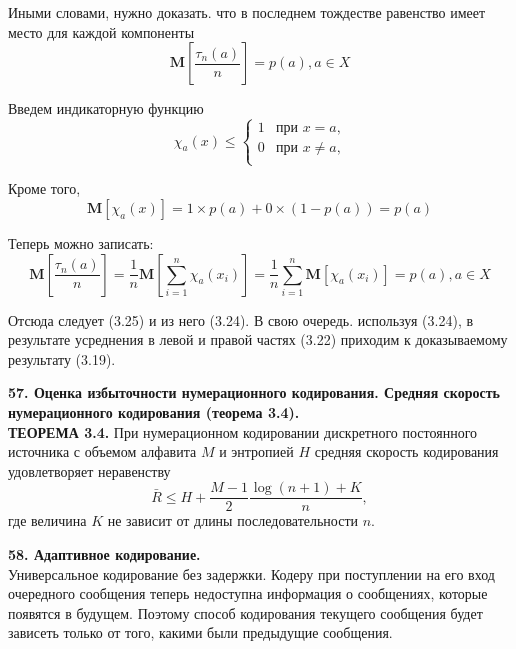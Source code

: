 \documentclass[14pt]{article}
\begin{document}
Иными словами, нужно доказать. что в последнем тождестве равенство имеет место для каждой компоненты
\begin{displaymath}
    \textbf{M}\left[\frac{\tau_n(a)}{n}\right] = p(a), a \in X
\end{displaymath}

Введем индикаторную функцию
\begin{displaymath}
    \chi_a(x) \leq \left\{ \begin{array}{ll}
    1 & \textrm{при \(x = a\),}\\
    0 & \textrm{при \(x \neq a\),}\\
  \end{array} \right.
\end{displaymath}

Кроме того,
\begin{displaymath}
    \textbf{M}[\chi_a(x)] = 1 \times p(a) + 0 \times (1 - p(a)) = p(a) 
\end{displaymath}

Теперь можно записать:
\begin{displaymath}
    \textbf{M}\left[\frac{\tau_n(a)}{n}\right] = \frac{1}{n}\textbf{M}\left[\sum_{i=1}^{n} \chi_a(x_i)\right] = \frac{1}{n}\sum_{i=1}^{n} \textbf{M}[\chi_a(x_i)] = p(a), a \in X
\end{displaymath}

Отсюда следует (3.25) и из него (3.24). В свою очередь. используя (3.24), в результате усреднения в левой и правой частях (3.22) приходим к доказываемому результату (3.19).

\bigskip
\textbf{57. Оценка избыточности нумерационного кодирования. Средняя скорость нумерационного кодирования (теорема 3.4).} \\

\textbf{ТЕОРЕМА 3.4.} При нумерационном кодировании дискретного постоянного источника с объемом алфавита \(M\) и энтропией \(H\) средняя скорость кодирования удовлетворяет неравенству
\begin{displaymath}
    \bar{R} \leq H + \frac{M - 1}{2}\frac{\log(n + 1) + K}{n},
\end{displaymath}
где величина \(K\) не зависит от длины последовательности \(n\).


\bigskip
\textbf{58. Адаптивное кодирование.} \\

Универсальное кодирование без задержки. Кодеру при поступлении на его вход очередного сообщения теперь недоступна информация о сообщениях, которые появятся в будущем. Поэтому способ кодирования текущего сообщения будет зависеть только от того, какими были предыдущие сообщения.
\end{document}
